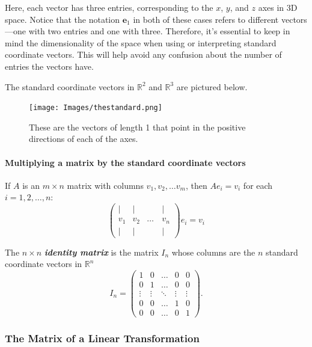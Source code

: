 \documentclass[a4paper,12pt]{article}
\begin{document}
Here, each vector has three entries, corresponding to the $x$, $y$, and $z$ axes in 3D space. Notice that the notation $\mathbf{e}_1$ in both of these cases refers to different vectors—one with two entries and one with three. Therefore, it’s essential to keep in mind the dimensionality of the space when using or interpreting standard coordinate vectors. This will help avoid any confusion about the number of entries the vectors have.

The standard coordinate vectors in \(\mathbb{R}^2\) and \(\mathbb{R}^3\) are pictured below.
\begin{figure}[H]
    \centering
    \texttt{[image: Images/thestandard.png]}
    \caption{\centering These are the vectors of length 1 that point in the positive directions of each of the axes.}
    \label{fig:coordinate-vectors}
\end{figure}
\paragraph{Multiplying a matrix by the standard coordinate vectors} If $A$ is an $m \times n$ matrix with columns $v_1, v_2,\dots v_m$, then $Ae_i=v_i$ for each $i = 1,2,\dots,n$:
\[
\begin{pmatrix}
    | & | & \quad & |\\
    v_1 & v_2 & \dots & v_n\\
    | & | & \quad & |
\end{pmatrix} e_i = v_i
\]


\begin{tcolorbox}[title=Definition,colframe=blue!70!black, colback=blue!5!white]
The $n \times n$ \textit{\textbf{identity matrix}} is the matrix $I_n$ whose columns are the $n$ standard coordinate vectors in \(\mathbb{R}^n\)
\[
I_n = \begin{pmatrix}
    1 & 0 & \dots & 0 & 0 \\
    0 & 1 & \dots & 0 & 0 \\
    \vdots & \vdots & \ddots & \vdots & \vdots \\
    0 & 0 & \dots & 1 & 0 \\
    0 & 0 & \dots & 0 & 1
\end{pmatrix}.
\]
\end{tcolorbox}

\subsubsection{The Matrix of a Linear Transformation}
\end{document}
